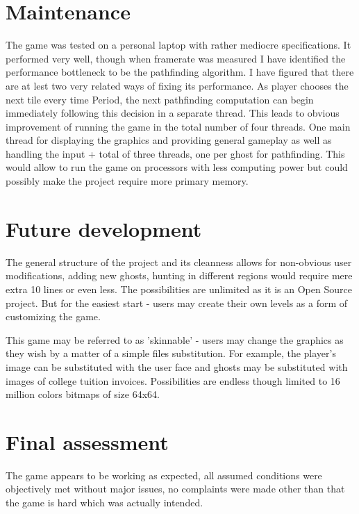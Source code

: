 \documentclass[11pt,a4paper,notitlepage]{report}
\begin{document}
		\section{Maintenance}
			The game was tested on a personal laptop with rather mediocre specifications. It performed very well, though when framerate was measured I have identified the performance bottleneck to be the pathfinding algorithm. I have figured that there are at lest two very related ways of fixing its performance. As player chooses the next tile every time Period, the next pathfinding computation can begin immediately following this decision in a separate thread. This leads to obvious improvement of running the game in the total number of four threads. One main thread for displaying the graphics and providing general gameplay as well as handling the input + total of three threads, one per ghost for pathfinding. This would allow to run the game on processors with less computing power but could possibly make the project require more primary memory.
			
		\section{Future development}
			The general structure of the project and its cleanness allows for non-obvious user modifications, adding new ghosts, hunting in different regions would require mere extra 10 lines or even less. The possibilities are unlimited as it is an Open Source project. But for the easiest start - users may create their own levels as a form of customizing the game.
			
			This game may be referred to as 'skinnable' - users may change the graphics as they wish by a matter of a simple files substitution. For example, the player's image can be substituted with the user face and ghosts may be substituted with images of college tuition invoices. Possibilities are endless though limited to 16 million colors bitmaps of size 64x64. 
		\section{Final assessment}
			The game appears to be working as expected, all assumed conditions were objectively met without major issues, no complaints were made other than that the game is hard which was actually intended.
\end{document}
